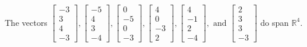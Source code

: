 \begin{exercise}
\begin{exerciseStatement}
  \end{exerciseStatement}
  \begin{exerciseAnswer}
   The vectors \(\left[\begin{array}{r}
-3 \\
3 \\
4 \\
-3
\end{array}\right] , \left[\begin{array}{r}
-5 \\
4 \\
3 \\
-4
\end{array}\right] , \left[\begin{array}{r}
0 \\
-5 \\
0 \\
-3
\end{array}\right] , \left[\begin{array}{r}
4 \\
0 \\
-3 \\
2
\end{array}\right] , \left[\begin{array}{r}
4 \\
-1 \\
2 \\
-4
\end{array}\right] , \text{ and } \left[\begin{array}{r}
2 \\
3 \\
3 \\
-3
\end{array}\right]\) 
  	 do  
	span \(\mathbb{R}^4\).
  


  \end{exerciseAnswer}
\end{exercise}